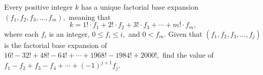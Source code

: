 Every positive integer $k$ has a unique factorial base expansion $(f_1,f_2,f_3,\ldots,f_m),$ meaning that \[ k=1!\cdot f_1+2!\cdot f_2+3!\cdot f_3+\cdots+m!\cdot f_m,  \] where each $f_i$ is an integer, $0\le f_i\le i,$ and $0<f_m.$  Given that $(f_1,f_2,f_3,\ldots,f_j)$ is the factorial base expansion of $16!-32!+48!-64!+\cdots+1968!-1984!+2000!,$ find the value of $f_1-f_2+f_3-f_4+\cdots+(-1)^{j+1}f_j.$